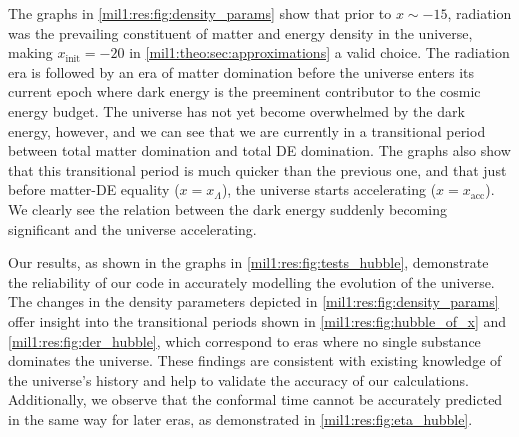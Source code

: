 
The graphs in \cref{mil1:res:fig:density_params} show that prior to $x\sim-15$, radiation was the prevailing constituent of matter and energy density in the universe, making $x_\mathrm{init}=-20$ in \cref{mil1:theo:sec:approximations} a valid choice. The radiation era is followed by an era of matter domination before the universe enters its current epoch where dark energy is the preeminent contributor to the cosmic energy budget. The universe has not yet become overwhelmed by the dark energy, however, and we can see that we are currently in a transitional period between total matter domination and total DE domination. The graphs also show that this transitional period is much quicker than the previous one, and that just before matter-DE equality ($x=x_{\Lambda}$), the universe starts accelerating ($x=x_\mathrm{acc}$). We clearly see the relation between the dark energy suddenly becoming significant and the universe accelerating. 

Our results, as shown in the graphs in \cref{mil1:res:fig:tests_hubble}, demonstrate the reliability of our code in accurately modelling the evolution of the universe. The changes in the density parameters depicted in \cref{mil1:res:fig:density_params} offer insight into the transitional periods shown in \cref{mil1:res:fig:hubble_of_x} and \cref{mil1:res:fig:der_hubble}, which correspond to eras where no single substance dominates the universe. These findings are consistent with existing knowledge of the universe's history and help to validate the accuracy of our calculations. Additionally, we observe that the conformal time cannot be accurately predicted in the same way for later eras, as demonstrated in \cref{mil1:res:fig:eta_hubble}. 


